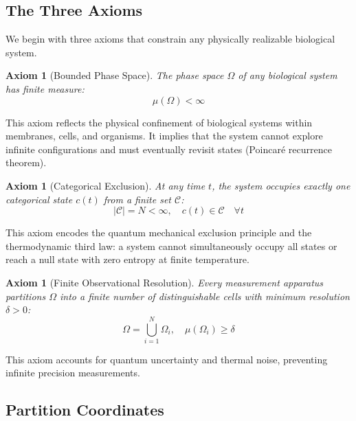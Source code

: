\documentclass[12pt,a4paper]{article}
\newtheorem{axiom}[theorem]{Axiom}
\begin{document}
\subsection{The Three Axioms}

We begin with three axioms that constrain any physically realizable biological system.

\begin{axiom}[Bounded Phase Space]
\label{ax:bounded}
The phase space $\Omega$ of any biological system has finite measure:
\begin{equation}
\mu(\Omega) < \infty
\end{equation}
\end{axiom}

This axiom reflects the physical confinement of biological systems within membranes, cells, and organisms. It implies that the system cannot explore infinite configurations and must eventually revisit states (Poincaré recurrence theorem).

\begin{axiom}[Categorical Exclusion]
\label{ax:exclusion}
At any time $t$, the system occupies exactly one categorical state $c(t)$ from a finite set $\mathcal{C}$:
\begin{equation}
|\mathcal{C}| = N < \infty, \quad c(t) \in \mathcal{C} \quad \forall t
\end{equation}
\end{axiom}

This axiom encodes the quantum mechanical exclusion principle and the thermodynamic third law: a system cannot simultaneously occupy all states or reach a null state with zero entropy at finite temperature.

\begin{axiom}[Finite Observational Resolution]
\label{ax:resolution}
Every measurement apparatus partitions $\Omega$ into a finite number of distinguishable cells with minimum resolution $\delta > 0$:
\begin{equation}
\Omega = \bigcup_{i=1}^{N} \Omega_i, \quad \mu(\Omega_i) \geq \delta
\end{equation}
\end{axiom}

This axiom accounts for quantum uncertainty and thermal noise, preventing infinite precision measurements.

\subsection{Partition Coordinates}
\end{document}
